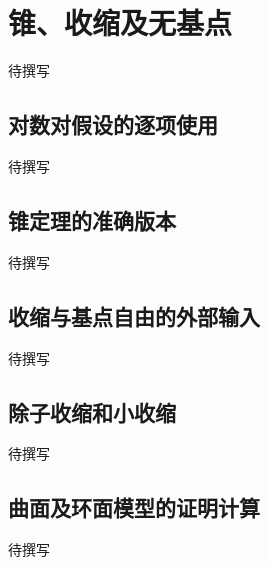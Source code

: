 
% 
% 

\section{锥、收缩及无基点}
\label{g5:sec:3003}

待撰写

\subsection{对数对假设的逐项使用}
\label{g5:subsec:3003:01}
待撰写

\subsection{锥定理的准确版本}
\label{g5:subsec:3003:02}
待撰写

\subsection{收缩与基点自由的外部输入}
\label{g5:subsec:3003:03}
待撰写

\subsection{除子收缩和小收缩}
\label{g5:subsec:3003:04}
待撰写

\subsection{曲面及环面模型的证明计算}
\label{g5:subsec:3003:05}
待撰写
